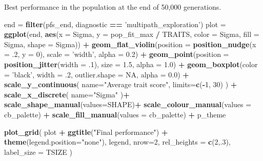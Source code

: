 \documentclass[]{book}
\newenvironment{Shaded}{\begin{snugshade}}{\end{snugshade}}
\newcommand{\DataTypeTok}[1]{\textcolor[rgb]{0.13,0.29,0.53}{#1}}
\newcommand{\DecValTok}[1]{\textcolor[rgb]{0.00,0.00,0.81}{#1}}
\newcommand{\FloatTok}[1]{\textcolor[rgb]{0.00,0.00,0.81}{#1}}
\newcommand{\KeywordTok}[1]{\textcolor[rgb]{0.13,0.29,0.53}{\textbf{#1}}}
\newcommand{\NormalTok}[1]{#1}
\newcommand{\OperatorTok}[1]{\textcolor[rgb]{0.81,0.36,0.00}{\textbf{#1}}}
\newcommand{\OtherTok}[1]{\textcolor[rgb]{0.56,0.35,0.01}{#1}}
\newcommand{\StringTok}[1]{\textcolor[rgb]{0.31,0.60,0.02}{#1}}
\begin{document}
Best performance in the population at the end of 50,000 generations.

\begin{Shaded}
\begin{Highlighting}[]
\NormalTok{end =}\StringTok{ }\KeywordTok{filter}\NormalTok{(pfs_end, diagnostic }\OperatorTok{==}\StringTok{ 'multipath_exploration'}\NormalTok{)}
\NormalTok{plot =}\StringTok{ }\KeywordTok{ggplot}\NormalTok{(end, }\KeywordTok{aes}\NormalTok{(}\DataTypeTok{x =}\NormalTok{ Sigma, }\DataTypeTok{y =}\NormalTok{ pop_fit_max }\OperatorTok{/}\StringTok{ }\NormalTok{TRAITS, }\DataTypeTok{color =}\NormalTok{ Sigma, }\DataTypeTok{fill =}\NormalTok{ Sigma, }\DataTypeTok{shape =}\NormalTok{ Sigma)) }\OperatorTok{+}
\StringTok{  }\KeywordTok{geom_flat_violin}\NormalTok{(}\DataTypeTok{position =} \KeywordTok{position_nudge}\NormalTok{(}\DataTypeTok{x =} \FloatTok{.2}\NormalTok{, }\DataTypeTok{y =} \DecValTok{0}\NormalTok{), }\DataTypeTok{scale =} \StringTok{'width'}\NormalTok{, }\DataTypeTok{alpha =} \FloatTok{0.2}\NormalTok{) }\OperatorTok{+}
\StringTok{  }\KeywordTok{geom_point}\NormalTok{(}\DataTypeTok{position =} \KeywordTok{position_jitter}\NormalTok{(}\DataTypeTok{width =} \FloatTok{.1}\NormalTok{), }\DataTypeTok{size =} \FloatTok{1.5}\NormalTok{, }\DataTypeTok{alpha =} \FloatTok{1.0}\NormalTok{) }\OperatorTok{+}
\StringTok{  }\KeywordTok{geom_boxplot}\NormalTok{(}\DataTypeTok{color =} \StringTok{'black'}\NormalTok{, }\DataTypeTok{width =} \FloatTok{.2}\NormalTok{, }\DataTypeTok{outlier.shape =} \OtherTok{NA}\NormalTok{, }\DataTypeTok{alpha =} \FloatTok{0.0}\NormalTok{) }\OperatorTok{+}
\StringTok{  }\KeywordTok{scale_y_continuous}\NormalTok{(}
    \DataTypeTok{name=}\StringTok{"Average trait score"}\NormalTok{,}
    \DataTypeTok{limits=}\KeywordTok{c}\NormalTok{(}\OperatorTok{-}\DecValTok{1}\NormalTok{, }\DecValTok{30}\NormalTok{)}
\NormalTok{  ) }\OperatorTok{+}
\StringTok{  }\KeywordTok{scale_x_discrete}\NormalTok{(}
    \DataTypeTok{name=}\StringTok{"Sigma"}
\NormalTok{  )}\OperatorTok{+}
\StringTok{  }\KeywordTok{scale_shape_manual}\NormalTok{(}\DataTypeTok{values=}\NormalTok{SHAPE)}\OperatorTok{+}
\StringTok{  }\KeywordTok{scale_colour_manual}\NormalTok{(}\DataTypeTok{values =}\NormalTok{ cb_palette) }\OperatorTok{+}
\StringTok{  }\KeywordTok{scale_fill_manual}\NormalTok{(}\DataTypeTok{values =}\NormalTok{ cb_palette) }\OperatorTok{+}
\StringTok{  }\NormalTok{p_theme}

\KeywordTok{plot_grid}\NormalTok{(}
\NormalTok{  plot }\OperatorTok{+}
\StringTok{    }\KeywordTok{ggtitle}\NormalTok{(}\StringTok{"Final performance"}\NormalTok{) }\OperatorTok{+}
\StringTok{    }\KeywordTok{theme}\NormalTok{(}\DataTypeTok{legend.position=}\StringTok{"none"}\NormalTok{),}
\NormalTok{  legend,}
  \DataTypeTok{nrow=}\DecValTok{2}\NormalTok{,}
  \DataTypeTok{rel_heights =} \KeywordTok{c}\NormalTok{(}\DecValTok{2}\NormalTok{,.}\DecValTok{3}\NormalTok{),}
  \DataTypeTok{label_size =}\NormalTok{ TSIZE}
\NormalTok{)}
\end{Highlighting}
\end{Shaded}
\end{document}
